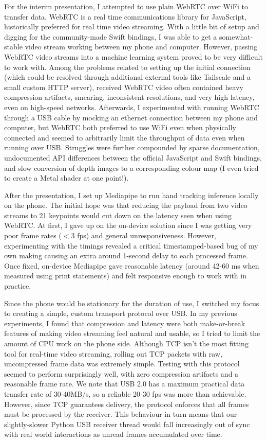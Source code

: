 \documentclass[12pt]{article}
\begin{document}
For the interim presentation, I attempted to use plain WebRTC \cite{webrtc} over WiFi to transfer data. WebRTC is a real time communications library for JavaScript, historically preferred for real time video streaming. With a little bit of setup and digging for the community-made Swift bindings, I was able to get a somewhat-stable video stream working between my phone and computer. However, passing WebRTC video streams into a machine learning system proved to be very difficult to work with. Among the problems related to setting up the initial connection (which could be resolved through additional external tools like Tailscale and a small custom HTTP server), received WebRTC video often contained heavy compression artifacts, smearing, inconsistent resolutions, and very high latency, even on high-speed networks. Afterwards, I experimented with running WebRTC through a USB cable by mocking an ethernet connection between my phone and computer, but WebRTC both preferred to use WiFi even when physically connected and seemed to arbitrarily limit the throughput of data even when running over USB. Struggles were further compounded by sparse documentation,  undocumented API differences between the official JavaScript and Swift bindings, and slow conversion of depth images to a corresponding colour map (I even tried to create a Metal shader at one point!).

After the presentation, I set up Mediapipe to run hand tracking inference locally on the phone. The initial hope was that reducing the payload from two video streams to 21 keypoints would cut down on the latency seen when using WebRTC.
At first, I gave up on the on-device solution since I was getting very poor frame rates ($<3$ fps) and general unresponsiveness. However, experimenting with the timings revealed a critical timestamped-based bug of my own making causing an extra around 1-second delay to each processed frame. Once fixed, on-device Mediapipe gave reasonable latency (around 42-60 ms when measured using print statements) and felt responsive enough to work with in practice.

Since the phone would be stationary for the duration of use, I switched my focus to creating a simple, custom transport protocol over USB. In my previous experiments, I found that compression and latency were both make-or-break features of making video streaming feel natural and usable, so I tried to limit the amount of CPU work on the phone side. Although TCP isn't the most fitting tool for real-time video streaming, rolling out TCP packets with raw, uncompressed frame data was extremely simple. Testing with this protocol seemed to perform surprisingly well, with zero compression artifacts and a reasonable frame rate. We note that USB 2.0 has a maximum practical data transfer rate of 30-40MB/s, so a reliable 20-30 fps was more than achievable. However, since TCP guarantees delivery, the protocol enforces that all frames must be processed by the receiver. This behaviour in turn means that our slightly-slower Python USB receiver thread would fall increasingly out of sync with real world interactions as unread frames accumulated over time.
\end{document}
